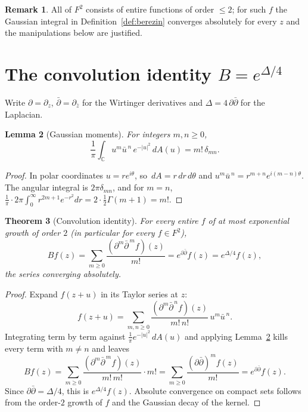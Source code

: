 \documentclass[11pt]{article}
\newtheorem{theorem}{Theorem}
\newtheorem{lemma}[theorem]{Lemma}
\theoremstyle{definition}
\newtheorem{remark}[theorem]{Remark}
\newcommand{\dA}{\,dA}
\newcommand{\C}{\mathbb{C}}
\newcommand{\dd}{\partial}
\begin{document}
\begin{remark}
All of $F^2$ consists of entire functions of order $\le 2$; for such $f$ the
Gaussian integral in Definition~\ref{def:berezin} converges absolutely for
every $z$ and the manipulations below are justified.
\end{remark}

\section{The convolution identity $B=e^{\Delta/4}$}

Write $\dd=\dd_z$, $\bar\dd=\dd_{\bar z}$ for the Wirtinger derivatives and
$\Delta=4\,\dd\bar\dd$ for the Laplacian.

\begin{lemma}[Gaussian moments]\label{lem:moments}
For integers $m,n\ge0$,
\[
  \frac1\pi\int_\C u^m\bar u^{\,n}\,e^{-|u|^2}\dA(u)=m!\,\delta_{mn}.
\]
\end{lemma}

\begin{proof}
In polar coordinates $u=re^{i\theta}$, so $\dA=r\,dr\,d\theta$ and
$u^m\bar u^{\,n}=r^{m+n}e^{i(m-n)\theta}$. The angular integral is
$2\pi\delta_{mn}$, and for $m=n$,
$\frac1\pi\cdot2\pi\int_0^\infty r^{2m+1}e^{-r^2}dr
=2\cdot\tfrac12\Gamma(m+1)=m!$.
\end{proof}

\begin{theorem}[Convolution identity]\label{thm:conv}
For every entire $f$ of at most exponential growth of order $2$ (in particular
for every $f\in F^2$),
\[
  Bf(z)=\sum_{m\ge0}\frac{(\dd^m\bar\dd^{\,m}f)(z)}{m!}
       =e^{\dd\bar\dd}f(z)=e^{\Delta/4}f(z),
\]
the series converging absolutely.
\end{theorem}

\begin{proof}
Expand $f(z+u)$ in its Taylor series at $z$:
\[
  f(z+u)=\sum_{m,n\ge0}\frac{(\dd^m\bar\dd^{\,n}f)(z)}{m!\,n!}\,u^m\bar u^{\,n}.
\]
Integrating term by term against $\frac1\pi e^{-|u|^2}\dA(u)$ and applying
Lemma~\ref{lem:moments} kills every term with $m\neq n$ and leaves
\[
  Bf(z)=\sum_{m\ge0}\frac{(\dd^m\bar\dd^{\,m}f)(z)}{m!\,m!}\cdot m!
       =\sum_{m\ge0}\frac{(\dd\bar\dd)^m f(z)}{m!}=e^{\dd\bar\dd}f(z).
\]
Since $\dd\bar\dd=\Delta/4$, this is $e^{\Delta/4}f(z)$. Absolute convergence
on compact sets follows from the order-$2$ growth of $f$ and the Gaussian
decay of the kernel.
\end{proof}
\end{document}
